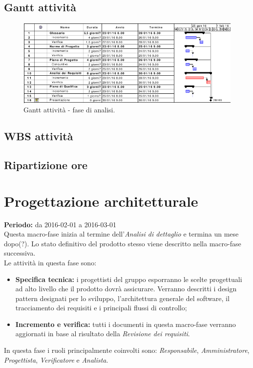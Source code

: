 \documentclass[a4paper]{report}
\begin{document}
			\subsection{Gantt attività}
				\begin{figure}[H]
					\centering
					\includegraphics[scale=0.5]{gantt-analisidettaglio}
					\caption{Gantt attività - fase di analisi.}
				\end{figure}
			\subsection{WBS attività}
			\subsection{Ripartizione ore}
		\section{Progettazione architetturale}
			\textbf{Periodo:} da 2016-02-01 a 2016-03-01 \\
			Questa macro-fase inizia al termine dell'\emph{Analisi di dettaglio} e termina un mese dopo(?). Lo 
			stato definitivo del prodotto stesso viene descritto nella macro-fase successiva. \\
			Le attività in questa fase sono:
			\begin{itemize}
				\item \textbf{Specifica tecnica:} i progettisti del gruppo esporranno le scelte progettuali ad alto 
				livello che il prodotto dovrà assicurare. Verranno descritti i design pattern designati per lo sviluppo, 
				l'architettura generale del software, il tracciamento dei requisiti e i principali flussi di controllo;
				\item \textbf{Incremento e verifica:} tutti i documenti in questa macro-fase verranno aggiornati in base 
				al risultato della \emph{Revisione dei requisiti}.
			\end{itemize}
			In questa fase i ruoli principalmente coinvolti sono: \emph{Responsabile}, \emph{Amministratore},
			\emph{Progettista}, \emph{Verificatore} e  \emph{Analista}.
\end{document}
